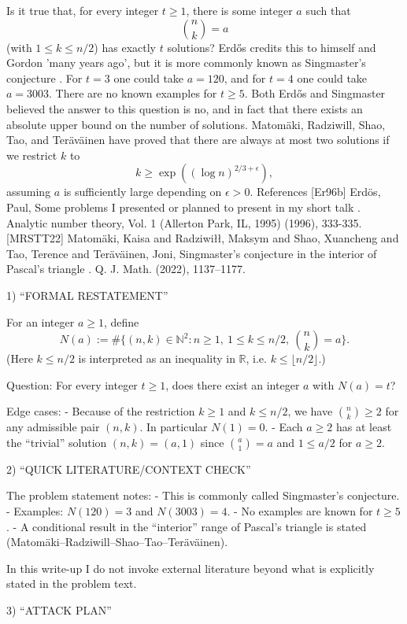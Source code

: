 Is it true that, for every integer $t\geq 1$, there is some integer $a$ such that\[\binom{n}{k}=a\](with $1\leq k\leq n/2$) has exactly $t$ solutions? Erd\H{o}s \cite{Er96b} credits this to himself and Gordon 'many years ago', but it is more commonly known as Singmaster's conjecture . For $t=3$ one could take $a=120$, and for $t=4$ one could take $a=3003$. There are no known examples for $t\geq 5$. Both Erd\H{o}s and Singmaster believed the answer to this question is no, and in fact that there exists an absolute upper bound on the number of solutions. Matom\"{a}ki, Radziwill, Shao, Tao, and Ter\"{a}v\"{a}inen \cite{MRSTT22} have proved that there are always at most two solutions if we restrict $k$ to\[k\geq \exp((\log n)^{2/3+\epsilon}),\]assuming $a$ is sufficiently large depending on $\epsilon>0$. References [Er96b] Erd\"{o}s, Paul, Some problems I presented or planned to present in my short talk . Analytic number theory, Vol. 1 (Allerton Park, IL, 1995) (1996), 333-335. [MRSTT22] Matom\"{a}ki, Kaisa and Radziwi\l\l, Maksym and Shao, Xuancheng and Tao, Terence and Ter\"{a}v\"{a}inen, Joni, Singmaster's conjecture in the interior of {P}ascal's triangle . Q. J. Math. (2022), 1137--1177.

1) “FORMAL RESTATEMENT”

For an integer $a\ge 1$, define
\[
N(a):=\#\{(n,k)\in\mathbb{N}^2: n\ge 1,\ 1\le k\le n/2,\ \binom{n}{k}=a\}.
\]
(Here $k\le n/2$ is interpreted as an inequality in $\mathbb{R}$, i.e. $k\le \lfloor n/2\rfloor$.)

Question: For every integer $t\ge 1$, does there exist an integer $a$ with $N(a)=t$?

Edge cases:
- Because of the restriction $k\ge 1$ and $k\le n/2$, we have $\binom{n}{k}\ge 2$ for any admissible pair $(n,k)$. In particular $N(1)=0$.
- Each $a\ge 2$ has at least the “trivial” solution $(n,k)=(a,1)$ since $\binom{a}{1}=a$ and $1\le a/2$ for $a\ge 2$.

2) “QUICK LITERATURE/CONTEXT CHECK”

The problem statement notes:
- This is commonly called Singmaster's conjecture.
- Examples: $N(120)=3$ and $N(3003)=4$.
- No examples are known for $t\ge 5$.
- A conditional result in the “interior” range of Pascal's triangle is stated (Matom\"{a}ki--Radziwill--Shao--Tao--Ter\"{a}v\"{a}inen).

In this write-up I do not invoke external literature beyond what is explicitly stated in the problem text.

3) “ATTACK PLAN”


